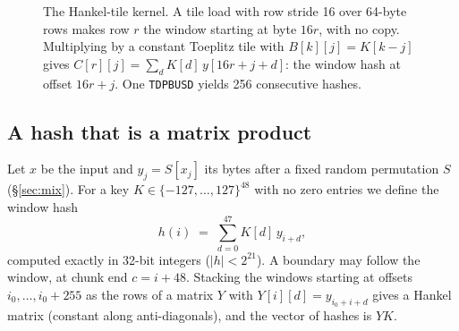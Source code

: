 \documentclass[10pt,twocolumn]{article}
\begin{document}
\begin{figure}[t]
\centering
{}
\caption{The Hankel-tile kernel. A tile load with row stride 16 over 64-byte rows makes row $r$ the window starting at byte $16r$, with no copy. Multiplying by a constant Toeplitz tile with $B[k][j]=K[k-j]$ gives $C[r][j]=\sum_d K[d]\,y[16r+j+d]$: the window hash at offset $16r+j$. One \texttt{TDPBUSD} yields 256 consecutive hashes.}
\label{fig:tile}
\end{figure}

\subsection{A hash that is a matrix product}
Let $x$ be the input and $y_j=S[x_j]$ its bytes after a fixed random permutation $S$ (\S\ref{sec:mix}). For a key $K\in\{-127,\dots,127\}^{48}$ with no zero entries we define the window hash
\begin{equation}
h(i) \;=\; \sum_{d=0}^{47} K[d]\, y_{i+d},
\end{equation}
computed exactly in 32-bit integers ($|h|<2^{21}$). A boundary may follow the window, at chunk end $c=i+48$. Stacking the windows starting at offsets $i_0,\dots,i_0+255$ as the rows of a matrix $Y$ with $Y[i][d]=y_{i_0+i+d}$ gives a Hankel matrix (constant along anti-diagonals), and the vector of hashes is $Y K$.
\end{document}
